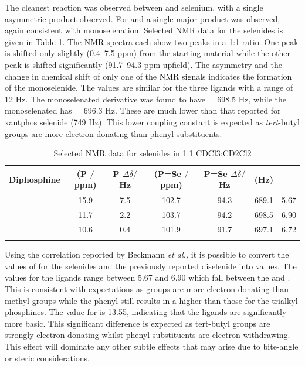 The cleanest reaction was observed between \tBuxantphos{} and selenium, with a single asymmetric product observed.  For \tButhixantphos{} and \tBusixantphos{} a single major product was observed, again consistent with monoselenation. Selected NMR data for the selenides is given in Table \ref{table:selenides}.  The \phosphorus{} NMR spectra each show two peaks in a 1:1 ratio.  One peak is shifted only slightly (0.4--7.5 ppm) from the starting material while the other peak is shifted significantly (91.7--94.3 ppm upfield).  The asymmetry and the change in chemical shift of only one of the \phosphorus{} NMR signals indicates the formation of the monoselenide.  The \JPSe{} values are similar for the three ligands with a range of 12 Hz.  The monoselenated \tButhixantphos{} derivative was found to have \JPSe{} = 698.5 Hz, while the monoselenated \tBuxantphos{} has \JPSe{} = 696.3 Hz.  These are much lower than that reported for xantphos selenide (749 Hz)\cite{Jahromi2012}.  This lower coupling constant is expected as \emph{tert}-butyl groups are more electron donating than phenyl substituents.

\begin{table}
\caption[Selected \phosphorus{} NMR data for \tBuxantphos{} selenides]{Selected \phosphorus{} NMR data for \tBuxantphos{} selenides in 1:1 CDCl3:CD2Cl2}
\vspace{1em}
\label{table:selenides}
\small
\begin{center}
\begin{tabular}{l c c c c c c}
	\toprule
	\bfseries{Diphosphine} & \bfseries{\phosphorus{} (P $/$ppm)} & \bfseries{P $\Delta\delta/$Hz} &\bfseries{\phosphorus{} (P=Se $/$ppm)} & \bfseries{P=Se $\Delta\delta/$Hz} & \bfseries{\JPSe (Hz)} & \bfseries{\pKb} \\
	\midrule		
	\tBuSixantphos		&15.9	& 7.5 	& 102.7	& 94.3	& 689.1	& 5.67\\
	\tBuThixantphos	&11.7	& 2.2		& 103.7	& 94.2	& 698.5	& 6.90\\
	\tBuXantphos		&10.6	& 0.4		& 101.9	& 91.7	& 697.1	& 6.72\\
	\bottomrule{}
\end{tabular}
\end{center}
\end{table}

Using the correlation reported by Beckmann \emph{et al.,} it is possible to convert the values of \JPSe{} for the \tBuxantphos{} selenides and the previously reported \Phxantphos{} diselenide into \pKb{} values.\cite{Jahromi2012}  The \pKb{} values for the \tBuxantphos{} ligands range between 5.67 and 6.90 which fall between the  and .\cite{Beckmann2011}  This is consistent with expectations as \tBu{} groups are more electron donating than methyl groups while the phenyl still results in a higher \pKb{} than those for the trialkyl phosphines.  The \pKb{} value for \Phxantphos{} is 13.55, indicating that the \tBuxantphos{} ligands are significantly more basic.  This significant difference is expected as tert-butyl groups are strongly electron donating whilst phenyl substituents are electron withdrawing.\cite{Tolman1977}  This effect will dominate any other subtle effects that may arise due to bite-angle or steric considerations.  
  
